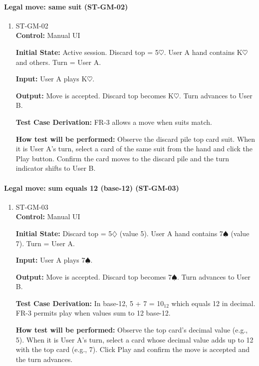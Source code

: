 \documentclass[12pt, titlepage]{article}
\begin{document}
\paragraph{Legal move: same suit (ST-GM-02)}
\begin{enumerate}
\item{ST-GM-02\\}
\textbf{Control:} Manual UI

\textbf{Initial State:} Active session. Discard top = 5$\heartsuit$. User A hand contains K$\heartsuit$ and others. Turn = User A.

\textbf{Input:} User A plays K$\heartsuit$.

\textbf{Output:} Move is accepted. Discard top becomes K$\heartsuit$. Turn advances to User B.

\textbf{Test Case Derivation:} FR-3 allows a move when suits match.

\textbf{How test will be performed:} Observe the discard pile top card suit. When it is User A's turn, select a card of the same suit from the hand and click the Play button. Confirm the card moves to the discard pile and the turn indicator shifts to User B.
\end{enumerate}

\paragraph{Legal move: sum equals 12 (base-12) (ST-GM-03)}
\begin{enumerate}
\item{ST-GM-03\\}
\textbf{Control:} Manual UI

\textbf{Initial State:} Discard top = 5$\diamondsuit$ (value 5). User A hand contains 7$\spadesuit$ (value 7). Turn = User A.

\textbf{Input:} User A plays 7$\spadesuit$.

\textbf{Output:} Move is accepted. Discard top becomes 7$\spadesuit$. Turn advances to User B.

\textbf{Test Case Derivation:} In base-12, 5 + 7 = 10$_{12}$ which equals 12 in decimal. FR-3 permits play when values sum to 12 base-12.

\textbf{How test will be performed:} Observe the top card's decimal value (e.g., 5). When it is User A's turn, select a card whose decimal value adds up to 12 with the top card (e.g., 7). Click Play and confirm the move is accepted and the turn advances.
\end{enumerate}
\end{document}
